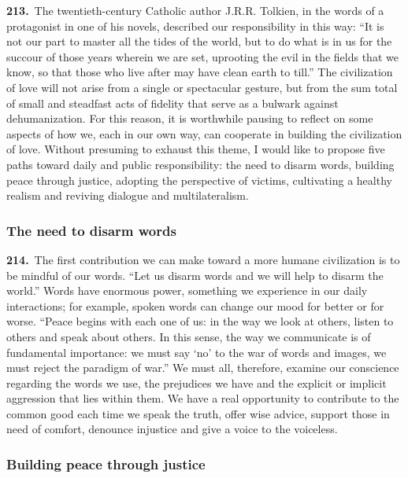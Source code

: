 \documentclass{article}
\begin{document}
\textbf{213.}\ The twentieth-century Catholic author J.R.R. Tolkien, in the words of a protagonist in one of his novels, described our responsibility in this way: ``It is not our part to master all the tides of the world, but to do what is in us for the succour of those years wherein we are set, uprooting the evil in the fields that we know, so that those who live after may have clean earth to till.''\cite{n187} The civilization of love will not arise from a single or spectacular gesture, but from the sum total of small and steadfast acts of fidelity that serve as a bulwark against dehumanization. For this reason, it is worthwhile pausing to reflect on some aspects of how we, each in our own way, can cooperate in building the civilization of love. Without presuming to exhaust this theme, I would like to propose five paths toward daily and public responsibility: the need to disarm words, building peace through justice, adopting the perspective of victims, cultivating a healthy realism and reviving dialogue and multilateralism.

\subsubsection{The need to disarm words}

\textbf{214.}\ The first contribution we can make toward a more humane civilization is to be mindful of our words. ``Let us disarm words and we will help to disarm the world.''\cite{n188} Words have enormous power, something we experience in our daily interactions; for example, spoken words can change our mood for better or for worse. ``Peace begins with each one of us: in the way we look at others, listen to others and speak about others. In this sense, the way we communicate is of fundamental importance: we must say `no' to the war of words and images, we must reject the paradigm of war.''\cite{n189} We must all, therefore, examine our conscience regarding the words we use, the prejudices we have and the explicit or implicit aggression that lies within them. We have a real opportunity to contribute to the common good each time we speak the truth, offer wise advice, support those in need of comfort, denounce injustice and give a voice to the voiceless.

\subsubsection{Building peace through justice}
\end{document}
